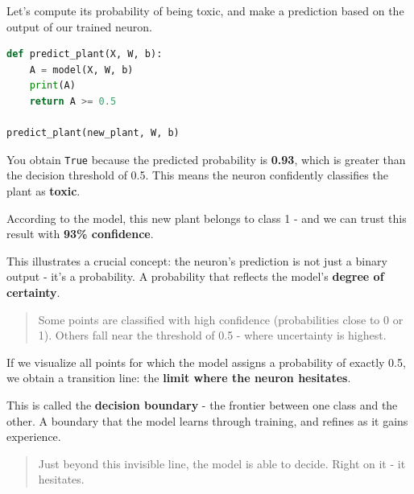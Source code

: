\documentclass[11pt]{article}
\begin{document}
Let's compute its probability of being toxic, and make a prediction based on the output of our trained neuron.

\begin{lstlisting}[language=Python]
def predict_plant(X, W, b):
    A = model(X, W, b)
    print(A)
    return A >= 0.5

predict_plant(new_plant, W, b)
\end{lstlisting}

\vspace{1em}

You obtain \texttt{True} because the predicted probability is \textbf{0.93}, which is greater than the decision threshold of 0.5.
This means the neuron confidently classifies the plant as \textbf{toxic}.

\vspace{0.5em}

According to the model, this new plant belongs to class 1 - and we can trust this result with \textbf{93\% confidence}.

\vspace{1em}

This illustrates a crucial concept: the neuron's prediction is not just a binary output - it's a probability.
A probability that reflects the model's \textbf{degree of certainty}.

\vspace{0.5em}

\begin{quote}
Some points are classified with high confidence (probabilities close to 0 or 1).
Others fall near the threshold of 0.5 - where uncertainty is highest.
\end{quote}

\vspace{0.5em}

If we visualize all points for which the model assigns a probability of exactly 0.5,
we obtain a transition line: the \textbf{limit where the neuron hesitates}.

This is called the \textbf{decision boundary} - the frontier between one class and the other.
A boundary that the model learns through training, and refines as it gains experience.

\vspace{0.5em}

\begin{quote}
Just beyond this invisible line, the model is able to decide.
Right on it - it hesitates.
\end{quote}
\end{document}
